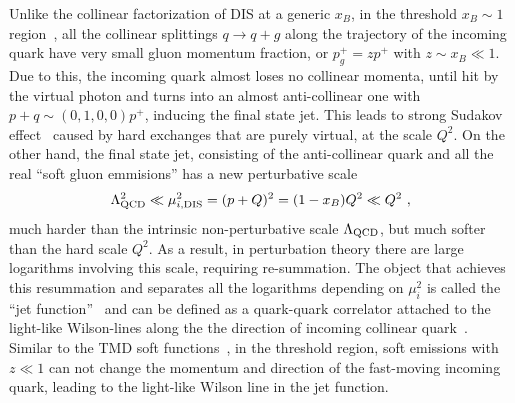 \documentclass[a4paper,11pt]{article}
\begin{document}
Unlike the collinear factorization of DIS at a generic $x_B$, in the threshold $x_B \sim 1$ region~\cite{Sterman:1986aj,Catani:1989ne,Bauer:2002nz,Manohar:2003vb,Pecjak:2005uh,Chay:2005rz,Idilbi:2006dg,Chen:2006vd, Becher:2006mr,Bonvini:2012az}, all the collinear splittings $q\rightarrow q+g$ along the trajectory of the incoming quark have very small gluon momentum fraction, or $p_g^+=zp^+$ with $z \sim x_B \ll 1$. Due to this, the incoming quark almost loses no collinear momenta, until hit by the virtual photon and turns into an almost anti-collinear one with $p+q\sim(0,1,0,0)p^+$, inducing the final state jet. This leads to strong Sudakov effect~\cite{Sudakov:1954sw, Collins:1989bt} caused by hard exchanges that are purely virtual, at the scale $Q^2$.  
On the other hand, the final state jet, consisting of the anti-collinear quark and all the real ``soft gluon emmisions'' has a new perturbative scale
\begin{align}
\Lambda_{\rm QCD}^2\ll \mu_{i, {\rm DIS}}^2=(p+Q)^2=(1-x_B)Q^2 \ll Q^2 \ ,
\end{align}
much harder than the intrinsic non-perturbative scale $\Lambda_{\rm QCD}$, but much softer than the hard scale $Q^2$. As a result, in perturbation theory there are large logarithms involving this scale, requiring re-summation. The object that achieves this resummation and separates all the logarithms depending on $\mu_i^2$
is called  the ``jet function''~\cite{Sterman:1986aj,Korchemsky:1992xv,Bosch:2004th,Becher:2006mr,Becher:2006qw} and can be defined as a quark-quark correlator attached to the light-like Wilson-lines along the the direction of incoming collinear quark~\cite{Sterman:1986aj,Korchemsky:1992xv,Becher:2006mr,Becher:2006qw}. Similar to the TMD soft functions~\cite{Collins:1981uk, Ji:2004wu, Echevarria:2015byo,Lubbert:2016rku, Ji:2019ewn,Ji:2020ect}, in the threshold region, soft emissions with $z\ll 1$ can not change the momentum and direction of the fast-moving incoming quark, leading to the light-like Wilson line in the jet function. 
\end{document}

